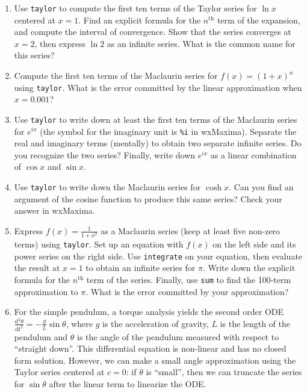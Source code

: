 \documentclass[10.5pt,twoside]{report}
\theoremstyle{definition}
\begin{document}
\begin{enumerate}
\item Use \verb|taylor| to compute the first ten terms of the Taylor series for $\ln{x}$ centered at $x=1$.  Find an explicit formula for the $n^{\mathrm{th}}$ term of the expansion, and compute the interval of convergence.  Show that the series converges at $x=2$, then express $\ln{2}$ as an infinite series.  What is the common name for this series?

\item Compute the first ten terms of the Maclaurin series for $f(x)=(1+x)^n$ using \verb|taylor|.  What is the error committed by the linear approximation when $x=0.001$?

\item Use \verb|taylor| to write down at least the first ten terms of the Maclaurin series for $e^{ix}$ (the symbol for the imaginary unit is \verb|%i| in wxMaxima).  Separate the real and imaginary terms (mentally) to obtain two separate infinite series.  Do you recognize the two series?  Finally, write down $e^{ix}$ as a linear combination of $\cos{x}$ and $\sin{x}$.

\item Use \verb|taylor| to write down the Maclaurin series for $\cosh{x}$.  Can you find an argument of the cosine function to produce this same series?  Check your answer in wxMaxima.

\item Express $f(x)=\frac{1}{1+x^2}$ as a Maclaurin series (keep at least five non-zero terms) using \verb|taylor|.  Set up an equation with $f(x)$  on the left side and its power series on the right side.  Use \verb|integrate| on your equation, then evaluate the result at $x=1$ to obtain an infinite series for $\pi$. Write down the explicit formula for the $n^{\mathrm{th}}$ term of the series. Finally, use \verb|sum| to find the 100-term approximation to $\pi$.  What is the error committed by your approximation?


\item For the simple pendulum, a torque analysis yields the second order ODE $\frac{\mathrm{d}^2 \theta}{\mathrm{d} t^2}= -\frac{g}{L} \sin{\theta}$, where $g$ is the acceleration of gravity, $L$ is the length of the pendulum and $\theta$ is the angle of the pendulum measured with respect to ``straight down''.  This differential equation is non-linear and has no closed form solution.  However, we can make a small angle approximation using the Taylor series centered at $c=0$:  if $\theta$ is ``small'', then we can truncate the series for $\sin {\theta}$ after the linear term to linearize the ODE.\\


\end{enumerate}
\end{document}
